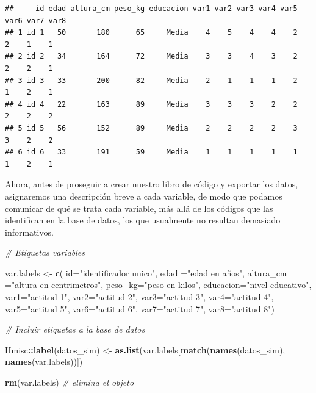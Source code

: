 \documentclass[
]{book}
\newenvironment{Shaded}{\begin{snugshade}}{\end{snugshade}}
\newcommand{\AttributeTok}[1]{\textcolor[rgb]{0.13,0.29,0.53}{#1}}
\newcommand{\CommentTok}[1]{\textcolor[rgb]{0.56,0.35,0.01}{\textit{#1}}}
\newcommand{\FunctionTok}[1]{\textcolor[rgb]{0.13,0.29,0.53}{\textbf{#1}}}
\newcommand{\NormalTok}[1]{#1}
\newcommand{\OtherTok}[1]{\textcolor[rgb]{0.56,0.35,0.01}{#1}}
\newcommand{\SpecialCharTok}[1]{\textcolor[rgb]{0.81,0.36,0.00}{\textbf{#1}}}
\newcommand{\StringTok}[1]{\textcolor[rgb]{0.31,0.60,0.02}{#1}}
\begin{document}
\begin{verbatim}
##     id edad altura_cm peso_kg educacion var1 var2 var3 var4 var5 var6 var7 var8
## 1 id 1   50       180      65     Media    4    5    4    4    2    2    1    1
## 2 id 2   34       164      72     Media    3    3    4    3    2    2    2    1
## 3 id 3   33       200      82     Media    2    1    1    1    2    1    2    1
## 4 id 4   22       163      89     Media    3    3    3    2    2    2    2    2
## 5 id 5   56       152      89     Media    2    2    2    2    3    3    2    2
## 6 id 6   33       191      59     Media    1    1    1    1    1    1    2    1
\end{verbatim}

Ahora, antes de proseguir a crear nuestro libro de código y exportar los datos, asignaremos una descripción breve a cada variable, de modo que podamos comunicar de qué se trata cada variable, más allá de los códigos que las identifican en la base de datos, los que usualmente no resultan demasiado informativos.

\begin{Shaded}
\begin{Highlighting}[]
\CommentTok{\# Etiquetas variables}

\NormalTok{var.labels  }\OtherTok{\textless{}{-}} \FunctionTok{c}\NormalTok{(}
\AttributeTok{id=}\StringTok{"identificador unico"}\NormalTok{,}
\AttributeTok{edad =}\StringTok{"edad en años"}\NormalTok{,}
\AttributeTok{altura\_cm =}\StringTok{"altura en centrimetros"}\NormalTok{,}
\AttributeTok{peso\_kg=}\StringTok{"peso en kilos"}\NormalTok{,}
\AttributeTok{educacion=}\StringTok{"nivel educativo"}\NormalTok{,}
\AttributeTok{var1=}\StringTok{"actitud 1"}\NormalTok{,}
\AttributeTok{var2=}\StringTok{"actitud 2"}\NormalTok{,}
\AttributeTok{var3=}\StringTok{"actitud 3"}\NormalTok{,}
\AttributeTok{var4=}\StringTok{"actitud 4"}\NormalTok{,}
\AttributeTok{var5=}\StringTok{"actitud 5"}\NormalTok{,}
\AttributeTok{var6=}\StringTok{"actitud 6"}\NormalTok{,}
\AttributeTok{var7=}\StringTok{"actitud 7"}\NormalTok{,}
\AttributeTok{var8=}\StringTok{"actitud 8"}\NormalTok{)}

\CommentTok{\# Incluir etiquetas a la base de datos}

\NormalTok{Hmisc}\SpecialCharTok{::}\FunctionTok{label}\NormalTok{(datos\_sim) }\OtherTok{\textless{}{-}} \FunctionTok{as.list}\NormalTok{(var.labels[}\FunctionTok{match}\NormalTok{(}\FunctionTok{names}\NormalTok{(datos\_sim), }\FunctionTok{names}\NormalTok{(var.labels))])}

\FunctionTok{rm}\NormalTok{(var.labels) }\CommentTok{\# elimina el objeto}
\end{Highlighting}
\end{Shaded}
\end{document}
